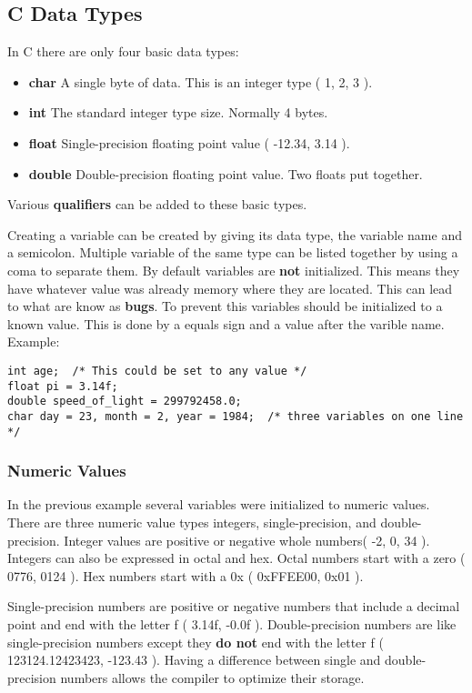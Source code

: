 \documentclass[10pt,a4paper]{paper}
\begin{document}
\subsection*{C Data Types}
In C there are only four basic data types:

\begin{itemize}
\item \textbf{char}  A single byte of data.  This is an integer type ( 1, 2, 3 ).
\item \textbf{int}  The standard integer type size.  Normally 4 bytes.
\item \textbf{float} Single-precision floating point value ( -12.34, 3.14 ).
\item \textbf{double} Double-precision floating point value.  Two floats put together.
\end{itemize}
Various \textbf{qualifiers} can be added to these basic types.

Creating a variable can be created by giving its data type, the variable name and a semicolon.  Multiple variable of the same type can be listed together by using a coma to separate them.  By default variables are \textbf{not} initialized.  This means they have whatever value was already memory where they are located.  This can lead to what are know as \textbf{bugs}.  To prevent this variables should be initialized to a known value.  This is done by a equals sign and a value after the varible name.  Example:

\begin{lstlisting}
int age;  /* This could be set to any value */
float pi = 3.14f;   
double speed_of_light = 299792458.0;
char day = 23, month = 2, year = 1984;  /* three variables on one line */
\end{lstlisting}

\subsubsection*{Numeric Values}

In the previous example several variables were initialized to numeric values.  There are three numeric value types integers, single-precision, and double-precision.  Integer values are positive or negative whole numbers( -2, 0, 34 ).  Integers can also be expressed in octal and hex.  Octal numbers start with a zero ( 0776, 0124 ).  Hex numbers start with a 0x ( 0xFFEE00, 0x01 ).

Single-precision numbers are positive or negative numbers that include a decimal point and end with the letter f ( 3.14f, -0.0f ).  Double-precision numbers are like single-precision numbers except they \textbf{do not} end with the letter f ( 123124.12423423, -123.43 ).  Having a difference between single and double-precision numbers allows the compiler to optimize their storage.  
\end{document}
